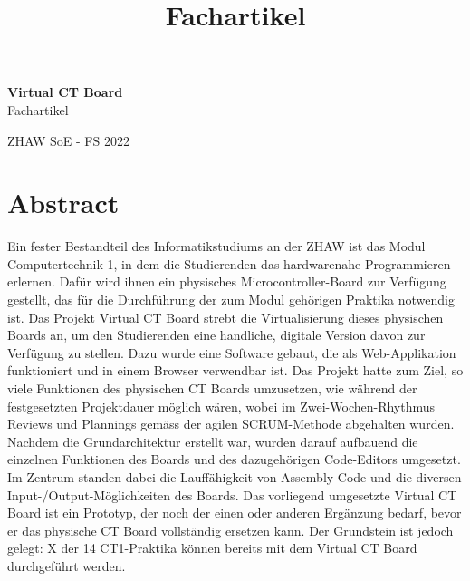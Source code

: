 \documentclass[10pt]{article}
\title{Fachartikel}
\begin{document}
\begin{titlepage}

\raggedleft %
	
	\vspace*{\baselineskip} %
	
	
	\vspace*{0.167\textheight} %
	
	\textbf{\LARGE Virtual CT Board}\\[\baselineskip] %
	
	\Huge Fachartikel\\[\baselineskip] %
	
	\vfill %
	
	{\large ZHAW SoE - FS 2022}
	
	\vspace*{3\baselineskip} %


\end{titlepage}

\section*{Abstract}
\thispagestyle{empty}


Ein fester Bestandteil des Informatikstudiums an der ZHAW ist das Modul \glqq Computertechnik 1\grqq, in dem die Studierenden das hardwarenahe Programmieren erlernen. Dafür wird ihnen ein physisches Microcontroller-Board zur Verfügung gestellt, das für die Durchführung der zum Modul gehörigen Praktika notwendig ist. Das Projekt \glqq Virtual CT Board\grqq{} strebt die Virtualisierung dieses physischen Boards an, um den Studierenden eine handliche, digitale Version davon zur Verfügung zu stellen. Dazu wurde eine Software gebaut, die als Web-Applikation funktioniert und in einem Browser verwendbar ist. Das Projekt hatte zum Ziel, so viele Funktionen des physischen CT Boards umzusetzen, wie während der festgesetzten Projektdauer möglich wären, wobei im Zwei-Wochen-Rhythmus Reviews und Plannings gemäss der agilen SCRUM-Methode abgehalten wurden. Nachdem die Grundarchitektur erstellt war, wurden darauf aufbauend die einzelnen Funktionen des Boards und des dazugehörigen Code-Editors umgesetzt. Im Zentrum standen dabei die Lauffähigkeit von Assembly-Code und die diversen Input-/Output-Möglichkeiten des Boards.
\newline Das vorliegend umgesetzte \glqq Virtual CT Board\grqq{} ist ein Prototyp, der noch der einen oder anderen Ergänzung bedarf, bevor er das physische CT Board vollständig ersetzen kann. Der Grundstein ist jedoch gelegt: X der 14 CT1-Praktika können bereits mit dem \glqq Virtual CT Board\grqq{} durchgeführt werden. 
\end{document}

